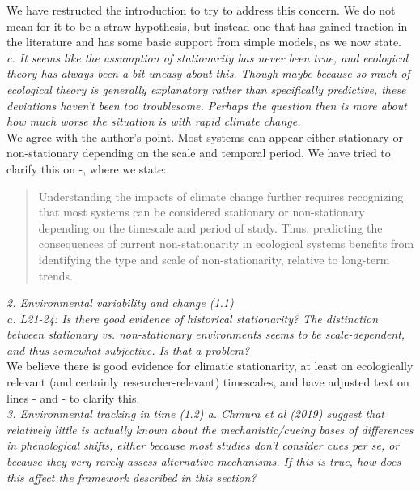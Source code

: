 \documentclass[11pt]{article}
\begin{document}
We have restructed the introduction to try to address this concern. We do not mean for it to be a straw hypothesis, but instead one that has gained traction in the literature and has some basic support from simple models, as we now state.\\

\emph{c.      It seems like the assumption of stationarity has never been true, and ecological
theory has always been a bit uneasy about this. Though maybe because so much of ecological
theory is generally explanatory rather than specifically predictive, these deviations haven't
been too troublesome. Perhaps the question then is more about how much worse the situation is
with rapid climate change.}\\

We agree with the author's point. Most systems can appear either stationary or non-stationary depending on the scale and temporal period. We have tried to clarify this on -, where we state:
\begin{quote}
Understanding the impacts of climate change further requires recognizing that most systems can be considered stationary or non-stationary depending on the timescale and period of study. Thus, predicting the consequences of current non-stationarity in ecological systems benefits from identifying the type and scale of non-stationarity, relative to long-term trends.
\end{quote}

\emph{2.      Environmental variability and change (1.1)\\
a.      L21-24: Is there good evidence of historical stationarity? The distinction between
stationary vs. non-stationary environments seems to be scale-dependent, and thus somewhat
subjective. Is that a problem?}\\

We believe there is good evidence for climatic stationarity, at least on ecologically relevant (and certainly researcher-relevant) timescales, and have adjusted text on lines - and - to clarify this. \\

\emph{3.      Environmental tracking in time (1.2)
a.      Chmura et al (2019) suggest that relatively little is actually known about the
mechanistic/cueing bases of differences in phenological shifts, either because most studies
don't consider cues per se, or because they very rarely assess alternative mechanisms. If
this is true, how does this affect the framework described in this section?}\\
\end{document}
